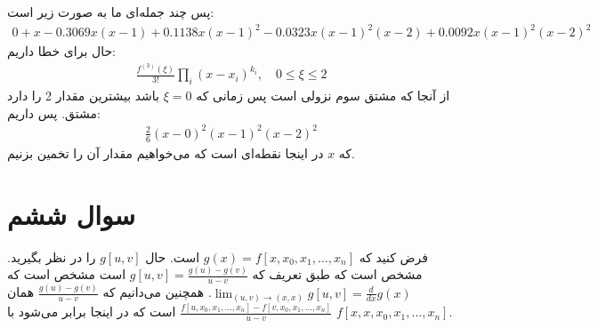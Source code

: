 \documentclass[]{article}
\begin{document}
پس چند جمله‌ای ما به صورت زیر است:
\begin{gather*}
    0 + x -0.3069 x (x-1) + 0.1138 x (x-1)^2 -0.0323 x (x-1)^2 (x-2) + 0.0092 x (x-1)^2 (x-2)^2
\end{gather*}
حال برای خطا داریم:
\begin{gather*}
    \frac{f^{(3)}(\xi)}{3!}\prod_i(x - x_i)^{k_i}, \quad 0 \le \xi \le 2
\end{gather*}
از آنجا که مشتق سوم نزولی است پس زمانی که
$\xi = 0$
باشد بیشترین مقدار 2 را دارد مشتق. پس داریم:
\begin{gather*}
    \frac{2}{6} (x - 0)^2 (x - 1)^2 (x - 2)^2 
\end{gather*}
که
$x$
در اینجا نقطه‌‌ای است که می‌خواهیم مقدار آن را تخمین بزنیم.
\section*{سوال ششم}

\noindent
فرض کنید که
$g(x) = f[x, x_0, x_1, \dots, x_n]$
است. حال
$g[u, v]$
را در نظر بگیرید. مشخص است که طبق تعریف که
$g[u, v] = \frac{g(u) - g(v)}{u - v}$
است مشخص است که
$\lim_{(u, v) \rightarrow (x, x)} g[u, v] = \frac{d}{dx} g(x)$.
همچنین می‌دانیم که
$\frac{g(u) - g(v)}{u - v}$
همان
$\frac{f[u, x_0, x_1, \dots, x_n] - f[v, x_0, x_1, \dots, x_n]}{u - v}$
است که در اینجا برابر می‌شود با
$f[x, x, x_0, x_1, \dots, x_n]$.
\end{document}
